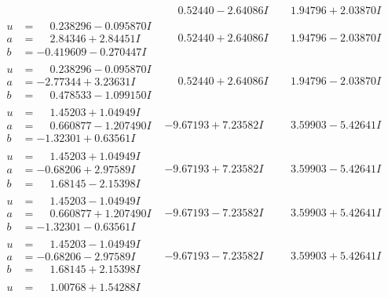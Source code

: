 \documentclass[1p]{elsarticle_modified}
\theoremstyle{definition}
\begin{document}
$$\begin{array}{c|c|c}
 & \phantom{-}0.52440 - 2.64086 I & \phantom{-}1.94796 + 2.03870 I \\ \hline\begin{aligned}
u &= \phantom{-}0.238296 - 0.095870 I \\
a &= \phantom{-}2.84346 + 2.84451 I \\
b &= -0.419609 - 0.270447 I\end{aligned}
 & \phantom{-}0.52440 + 2.64086 I & \phantom{-}1.94796 - 2.03870 I \\ \hline\begin{aligned}
u &= \phantom{-}0.238296 - 0.095870 I \\
a &= -2.77344 + 3.23631 I \\
b &= \phantom{-}0.478533 - 1.099150 I\end{aligned}
 & \phantom{-}0.52440 + 2.64086 I & \phantom{-}1.94796 - 2.03870 I \\ \hline\begin{aligned}
u &= \phantom{-}1.45203 + 1.04949 I \\
a &= \phantom{-}0.660877 - 1.207490 I \\
b &= -1.32301 + 0.63561 I\end{aligned}
 & -9.67193 + 7.23582 I & \phantom{-}3.59903 - 5.42641 I \\ \hline\begin{aligned}
u &= \phantom{-}1.45203 + 1.04949 I \\
a &= -0.68206 + 2.97589 I \\
b &= \phantom{-}1.68145 - 2.15398 I\end{aligned}
 & -9.67193 + 7.23582 I & \phantom{-}3.59903 - 5.42641 I \\ \hline\begin{aligned}
u &= \phantom{-}1.45203 - 1.04949 I \\
a &= \phantom{-}0.660877 + 1.207490 I \\
b &= -1.32301 - 0.63561 I\end{aligned}
 & -9.67193 - 7.23582 I & \phantom{-}3.59903 + 5.42641 I \\ \hline\begin{aligned}
u &= \phantom{-}1.45203 - 1.04949 I \\
a &= -0.68206 - 2.97589 I \\
b &= \phantom{-}1.68145 + 2.15398 I\end{aligned}
 & -9.67193 - 7.23582 I & \phantom{-}3.59903 + 5.42641 I \\ \hline\begin{aligned}
u &= \phantom{-}1.00768 + 1.54288 I \\

\end{aligned}
\end{array}$$
\end{document}
